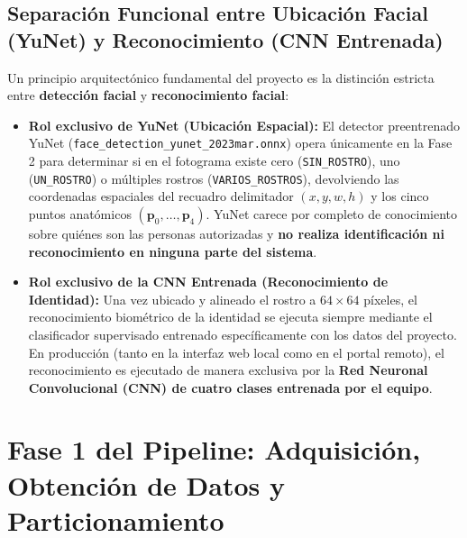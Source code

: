 \documentclass{article}
\begin{document}
\subsection{Separación Funcional entre Ubicación Facial (YuNet) y Reconocimiento (CNN Entrenada)}
Un principio arquitectónico fundamental del proyecto es la distinción estricta entre \textbf{detección facial} y \textbf{reconocimiento facial}:
\begin{itemize}
    \item \textbf{Rol exclusivo de YuNet (Ubicación Espacial):} El detector preentrenado YuNet (\texttt{face\_detection\_yunet\_2023mar.onnx}) opera únicamente en la Fase 2 para determinar si en el fotograma existe cero (\texttt{SIN\_ROSTRO}), uno (\texttt{UN\_ROSTRO}) o múltiples rostros (\texttt{VARIOS\_ROSTROS}), devolviendo las coordenadas espaciales del recuadro delimitador $(x, y, w, h)$ y los cinco puntos anatómicos $(\mathbf{p}_0, \dots, \mathbf{p}_4)$. YuNet carece por completo de conocimiento sobre quiénes son las personas autorizadas y \textbf{no realiza identificación ni reconocimiento en ninguna parte del sistema}.
    \item \textbf{Rol exclusivo de la CNN Entrenada (Reconocimiento de Identidad):} Una vez ubicado y alineado el rostro a $64 \times 64$ píxeles, el reconocimiento biométrico de la identidad se ejecuta siempre mediante el clasificador supervisado entrenado específicamente con los datos del proyecto. En producción (tanto en la interfaz web local como en el portal remoto), el reconocimiento es ejecutado de manera exclusiva por la \textbf{Red Neuronal Convolucional (CNN) de cuatro clases entrenada por el equipo}.
\end{itemize}

\section{Fase 1 del Pipeline: Adquisición, Obtención de Datos y Particionamiento}
\end{document}
